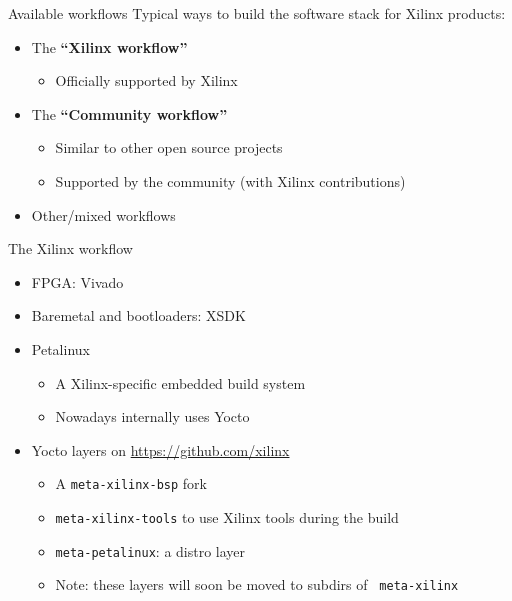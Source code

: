 \documentclass[xetex,table]{beamer}
\begin{document}
\begin{frame}{Available workflows}
  Typical ways to build the software stack for Xilinx products:
  \begin{itemize}
  \item The {\bf ``Xilinx workflow''}
    \begin{itemize}
    \item Officially supported by Xilinx
    \end{itemize}
  \item The {\bf ``Community workflow''}
    \begin{itemize}
    \item Similar to other open source projects
    \item Supported by the community (with Xilinx contributions)
    \end{itemize}
  \item Other/mixed workflows
  \end{itemize}
\end{frame}

\begin{frame}{The Xilinx workflow}
  \begin{itemize}
  \item FPGA: Vivado
  \item Baremetal and bootloaders: XSDK
  \item Petalinux
    \begin{itemize}
    \item A Xilinx-specific embedded build system
    \item Nowadays internally uses Yocto
    \end{itemize}
  \item Yocto layers on \url{https://github.com/xilinx}
    \begin{itemize}
    \item A {\tt meta-xilinx-bsp} fork
    \item {\tt meta-xilinx-tools} to use Xilinx tools during the build
    \item {\tt meta-petalinux}: a distro layer
    \item Note: these layers will soon be moved to subdirs of {\tt
      meta-xilinx}
  \end{itemize}
  \end{itemize}
\end{frame}
\end{document}
